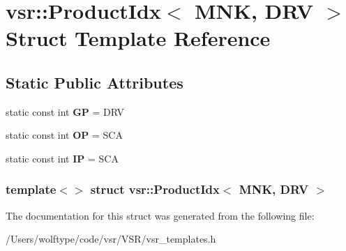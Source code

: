 \hypertarget{structvsr_1_1_product_idx_3_01_m_n_k_00_01_d_r_v_01_4}{\section{vsr\-:\-:Product\-Idx$<$ M\-N\-K, D\-R\-V $>$ Struct Template Reference}
\label{structvsr_1_1_product_idx_3_01_m_n_k_00_01_d_r_v_01_4}
}
\subsection*{Static Public Attributes}
\begin{DoxyCompactItemize}
\item 
\hypertarget{structvsr_1_1_product_idx_3_01_m_n_k_00_01_d_r_v_01_4_a477acd622aedb5447ace8c1658a516fa}{static const int {\bfseries G\-P} = D\-R\-V}\label{structvsr_1_1_product_idx_3_01_m_n_k_00_01_d_r_v_01_4_a477acd622aedb5447ace8c1658a516fa}

\item 
\hypertarget{structvsr_1_1_product_idx_3_01_m_n_k_00_01_d_r_v_01_4_a2c7f74c4edb00c3d39eea771df557137}{static const int {\bfseries O\-P} = S\-C\-A}\label{structvsr_1_1_product_idx_3_01_m_n_k_00_01_d_r_v_01_4_a2c7f74c4edb00c3d39eea771df557137}

\item 
\hypertarget{structvsr_1_1_product_idx_3_01_m_n_k_00_01_d_r_v_01_4_a29a7eaf5e8e961d90043e5505f2d8036}{static const int {\bfseries I\-P} = S\-C\-A}\label{structvsr_1_1_product_idx_3_01_m_n_k_00_01_d_r_v_01_4_a29a7eaf5e8e961d90043e5505f2d8036}

\end{DoxyCompactItemize}
\subsubsection*{template$<$$>$ struct vsr\-::\-Product\-Idx$<$ M\-N\-K, D\-R\-V $>$}



The documentation for this struct was generated from the following file\-:\begin{DoxyCompactItemize}
\item 
/\-Users/wolftype/code/vsr/\-V\-S\-R/vsr\-\_\-templates.\-h\end{DoxyCompactItemize}
